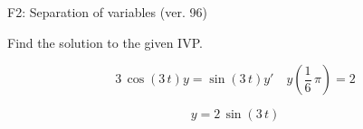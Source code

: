 \begin{exercise}
  \begin{exerciseTitle}F2: Separation of variables (ver. 96)\end{exerciseTitle}
  \begin{exerciseStatement}
    
Find the solution to the given IVP.

    
\[3 \, \cos\left(3 \, t\right) y= \sin\left(3 \, t\right) y'\hspace{1em} y\left( \frac{1}{6} \, \pi \right)= 2\]

  \end{exerciseStatement}
  \begin{exerciseAnswer}
    
\[y= 2 \, \sin\left(3 \, t\right)\]

  \end{exerciseAnswer}
\end{exercise}